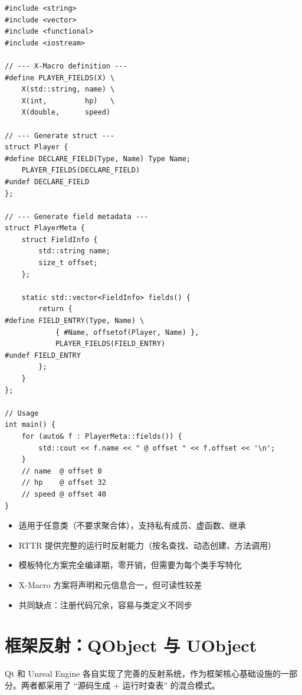 \documentclass[12pt,a4paper,fontset=fandol]{ctexbook}
\begin{document}
\begin{lstlisting}[caption={X-Macro 反射: 一处定义多处展开}]
#include <string>
#include <vector>
#include <functional>
#include <iostream>

// --- X-Macro definition ---
#define PLAYER_FIELDS(X) \
    X(std::string, name) \
    X(int,         hp)   \
    X(double,      speed)

// --- Generate struct ---
struct Player {
#define DECLARE_FIELD(Type, Name) Type Name;
    PLAYER_FIELDS(DECLARE_FIELD)
#undef DECLARE_FIELD
};

// --- Generate field metadata ---
struct PlayerMeta {
    struct FieldInfo {
        std::string name;
        size_t offset;
    };

    static std::vector<FieldInfo> fields() {
        return {
#define FIELD_ENTRY(Type, Name) \
            { #Name, offsetof(Player, Name) },
            PLAYER_FIELDS(FIELD_ENTRY)
#undef FIELD_ENTRY
        };
    }
};

// Usage
int main() {
    for (auto& f : PlayerMeta::fields()) {
        std::cout << f.name << " @ offset " << f.offset << '\n';
    }
    // name  @ offset 0
    // hp    @ offset 32
    // speed @ offset 40
}
\end{lstlisting}

\begin{note}[title={宏/模板反射方案要点}]
\begin{itemize}[nosep]
  \item 适用于任意类（不要求聚合体），支持私有成员、虚函数、继承
  \item RTTR 提供完整的运行时反射能力（按名查找、动态创建、方法调用）
  \item 模板特化方案完全编译期，零开销，但需要为每个类手写特化
  \item X-Macro 方案将声明和元信息合一，但可读性较差
  \item 共同缺点：注册代码冗余，容易与类定义不同步
\end{itemize}
\end{note}

\section{框架反射：QObject 与 UObject}\label{sec:framework}

Qt 和 Unreal Engine 各自实现了完善的反射系统，作为框架核心基础设施的一部分。两者都采用了 ``源码生成 + 运行时查表'' 的混合模式。
\end{document}
